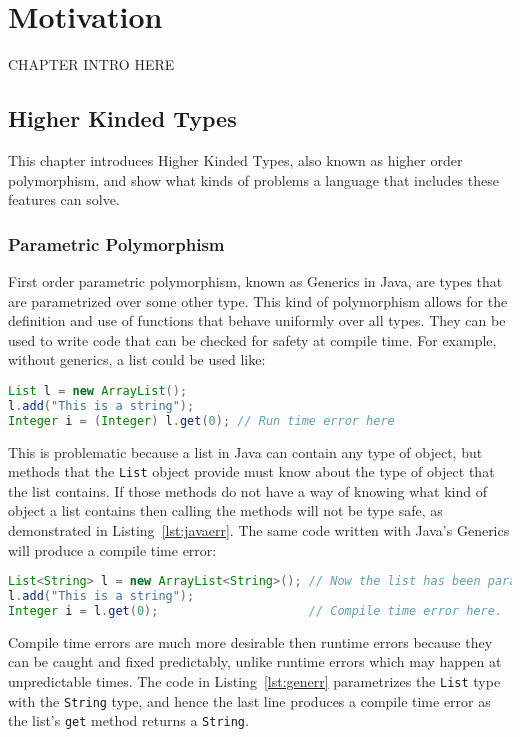\chapter{Motivation}\label{sec:motivation}
CHAPTER INTRO HERE

\section{Higher Kinded Types}
This chapter introduces Higher Kinded Types, also known as higher order
polymorphism, and show what kinds of problems a language that includes these
features can solve.

\subsection{Parametric Polymorphism}\label{sec:generics}
First order parametric polymorphism, known as Generics in Java, are types that
are parametrized over some other type. This kind of polymorphism allows for the
definition and use of functions that behave uniformly over all types.  They can
be used to write code that can be checked for safety at compile time. For
example, without generics, a list could be used like:

\begin{lstlisting}[caption=Runtime error that could be avoided, language=Java, label={lst:javaerr}]
List l = new ArrayList();
l.add("This is a string");
Integer i = (Integer) l.get(0); // Run time error here
\end{lstlisting}

This is problematic because a list in Java can contain any type of object, but
methods that the \lstinline{List} object provide must know about the type of
object that the list contains. If those methods do not have a way of knowing
what kind of object a list contains then calling the methods will not be type
safe, as demonstrated in Listing~\ref{lst:javaerr}. The same code written with
Java's Generics will produce a compile time error:

\begin{lstlisting}[caption=Compile time error, language=Java, label={lst:generr}]
List<String> l = new ArrayList<String>(); // Now the list has been parametrized with a type
l.add("This is a string");
Integer i = l.get(0);                     // Compile time error here.
\end{lstlisting}

Compile time errors are much more desirable then runtime errors because they
can be caught and fixed predictably, unlike runtime errors which may happen at
unpredictable times. The code in Listing~\ref{lst:generr} parametrizes the
\lstinline{List} type with the \lstinline{String} type, and hence the last line
produces a compile time error as the list's \lstinline{get} method returns a
\lstinline{String}. 

